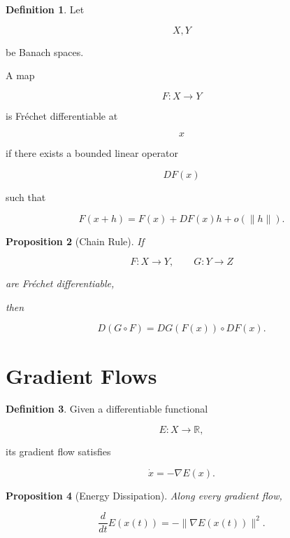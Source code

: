 \documentclass[11pt]{book}
\numberwithin{equation}{chapter}
\theoremstyle{definition}
\newtheorem{definition}{Definition}[chapter]
\theoremstyle{plain}
\newtheorem{proposition}[definition]{Proposition}
\begin{document}
\begin{definition}

Let

\[
X,Y
\]

be Banach spaces.

A map

\[
F:X\rightarrow Y
\]

is Fréchet differentiable at

\[
x
\]

if there exists a bounded linear operator

\[
DF(x)
\]

such that

\[
F(x+h)
=
F(x)
+
DF(x)h
+
o(\|h\|).
\]

\end{definition}


\begin{proposition}[Chain Rule]

If

\[
F:X\rightarrow Y,
\qquad
G:Y\rightarrow Z
\]

are Fréchet differentiable,

then

\[
D(G\circ F)
=
DG(F(x))
\circ
DF(x).
\]

\end{proposition}


\section{Gradient Flows}

\begin{definition}

Given a differentiable functional

\[
E:X\rightarrow\mathbb R,
\]

its gradient flow satisfies

\[
\dot x
=
-\nabla E(x).
\]

\end{definition}


\begin{proposition}[Energy Dissipation]

Along every gradient flow,

\[
\frac{d}{dt}
E(x(t))
=
-
\|\nabla E(x(t))\|^2.
\]

\end{proposition}
\end{document}
